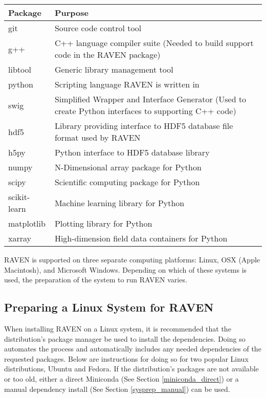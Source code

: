 \begin{center}
    \begin{tabular}{ | l | p{10cm} |}
    \hline Package & Purpose \\
    \hline git & Source code control tool \\
    \hline g++ & C++ language compiler suite (Needed to build
        support code in the RAVEN package) \\
    \hline libtool & Generic library management tool \\
    \hline python & Scripting language RAVEN is written in \\
    \hline swig & Simplified Wrapper and Interface Generator
        (Used to create Python interfaces to supporting C++ code) \\
    \hline hdf5 & Library providing interface to HDF5 database
        file format used by RAVEN \\
    \hline h5py & Python interface to HDF5 database library \\
    \hline numpy & N-Dimensional array package for Python \\
    \hline scipy &  Scientific computing package for Python \\
    \hline scikit-learn & Machine learning library for Python \\
    \hline matplotlib & Plotting library for Python \\
    \hline xarray & High-dimension field data containers for Python \\
    \hline
    \end{tabular}
\end{center}


RAVEN is supported on three separate computing platforms:
Linux, OSX (Apple Macintosh), and Microsoft Windows.  Depending
on which of these systems is used, the preparation of the system
to run RAVEN varies.

\subsection{Preparing a Linux System for RAVEN}
\label{sysprep_linux}

When installing RAVEN on a Linux system, it is recommended that the
distribution's package manager be used to install the dependencies.
Doing so automates the process and automatically includes any needed
dependencies of the requested packages.  Below are instructions for
doing so for two popular Linux distributions, Ubuntu and Fedora.  If
the distribution's packages are not available or too old, either a
direct Miniconda (See Section \ref{miniconda_direct}) or a manual
dependency install (See Section \ref{sysprep_manual}) can be used.

